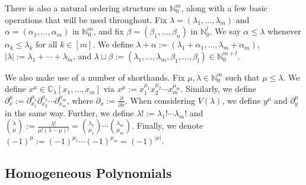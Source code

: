 \documentclass{article}
\theoremstyle{definition}
\theoremstyle{plain}
\newcommand{\C}{\mathbb{C}}
\newcommand{\N}{\mathbb{N}}
\begin{document}
There is also a natural ordering structure on $\N_0^m$, along with a few basic operations that will be used throughout. Fix $\lambda = (\lambda_1,\ldots,\lambda_m)$ and $\alpha = (\alpha_1,\ldots,\alpha_m)$ in $\N_0^m$, and fix $\beta = (\beta_1,\ldots,\beta_n)$ in $\N_0^l$. We say $\alpha \leq \lambda$ whenever $\alpha_k \leq \lambda_k$ for all $k \in [m]$. We define $\lambda + \alpha := (\lambda_1+\alpha_1,\ldots,\lambda_m+\alpha_m)$, $|\lambda| := \lambda_1 + \cdots + \lambda_m$, and $\lambda \sqcup \beta := (\lambda_1,\ldots,\lambda_m,\beta_1,\ldots,\beta_l) \in \N_0^{m+l}$.

We also make use of a number of shorthands. Fix $\mu,\lambda \in \N_0^m$ such that $\mu \leq \lambda$. We define $x^\mu \in \C_\lambda[x_1,\ldots,x_m]$ via $x^\mu := x_1^{\mu_1}x_2^{\mu_2} \cdots x_m^{\mu_m}$. Similarly, we define $\partial_x^\mu := \partial_{x_1}^{\mu_1} \partial_{x_2}^{\mu_2} \cdots \partial_{x_m}^{\mu_m}$, where $\partial_x := \frac{\partial}{\partial x}$. When considering $V(\lambda)$, we define $y^\mu$ and $\partial_y^\mu$ in the same way. Further, we define $\lambda! := \lambda_1! \cdots \lambda_m!$ and $\binom{\lambda}{\mu} := \frac{\lambda!}{\mu!(\lambda-\mu)!} = \binom{\lambda_1}{\mu_1} \cdots \binom{\lambda_m}{\mu_m}$. Finally, we denote $(-1)^\mu := (-1)^{\mu_1} \cdots (-1)^{\mu_m} = (-1)^{|\mu|}$.

\subsection{Homogeneous Polynomials}\label{homog_subsect}
\end{document}

